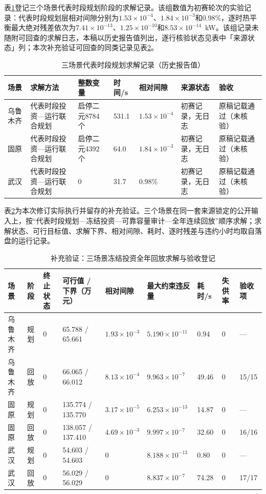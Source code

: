 表\ref{tab:alg-solver}登记三个场景代表时段规划阶段的求解记录。该组数值为初赛轮次的实验记录：代表时段规划层相对间隙分别为$1.53\times10^{-4}$、$1.84\times10^{-3}$和0.98\%，逐时热平衡最大绝对残差依次为$7.41\times10^{-13}$、$1.25\times10^{-10}$和$8.53\times10^{-14}$~kW。该组记录未随附可回查的求解日志，本稿以历史报告值列出，逐行核验状态见表中「来源状态」列；本次补充验证可回查的同类记录见表\ref{tab:alg-supplement}。

\begin{table}[H]
\centering
\caption{三场景代表时段规划求解记录（历史报告值）}
\label{tab:alg-solver}
\small
\begin{tabularx}{\textwidth}{@{}p{}p{}p{}p{}p{}p{}X@{}}
\toprule
场景 & 求解方法 & 整数变量 & 时间/s & 相对间隙 & 来源状态 & 验收\\
\midrule
乌鲁木齐 & 代表时段投资---运行联合规划 & 启停二元8784个 & 531.1 & $1.53\times10^{-4}$ & 初赛记录，无日志 & 原稿记载通过（未核验）\\
固原 & 代表时段投资---运行联合规划 & 启停二元4392个 & 64.0 & $1.84\times10^{-3}$ & 初赛记录，无日志 & 原稿记载通过（未核验）\\
武汉 & 代表时段投资---运行联合规划 & 0 & 31.7 & 0.98\% & 初赛记录，无日志 & 原稿记载通过（未核验）\\
\bottomrule
\end{tabularx}
\end{table}

表\ref{tab:alg-supplement}为本次修订实际执行并留存的补充验证。三个场景在同一套来源锁定的公开输入上，按“代表时段规划---冻结投资---可靠容量审计---全年连续回放”顺序求解；求解状态、可行目标值、求解下界、相对间隙、耗时、逐时残差与违约小时均取自落盘的运行记录。

\begin{table}[H]
\centering
\caption{补充验证：三场景冻结投资全年回放求解与验收登记}
\label{tab:alg-supplement}
\small
\begin{tabularx}{\textwidth}{@{}p{}p{}p{}p{}p{}p{}p{}p{}X@{}}
\toprule
场景 & 阶段 & 终止状态 & 可行值 / 下界（万元） & 相对间隙 & 最大约束违反量 & 耗时/s & 失供率 & 验收项\\
\midrule
乌鲁木齐 & 规划 & 0 & 65.788 / 65.661 & $1.93\times10^{-3}$ & $5.190\times10^{-11}$ & 0.94 & 0 & ---\\
乌鲁木齐 & 回放 & 0 & 66.065 / 66.012 & $8.13\times10^{-4}$ & $9.963\times10^{-7}$ & 49.46 & 0 & 15/15\\
固原 & 规划 & 0 & 135.774 / 135.770 & $3.17\times10^{-5}$ & $6.253\times10^{-13}$ & 14.87 & 0 & ---\\
固原 & 回放 & 0 & 138.057 / 137.410 & $4.69\times10^{-3}$ & $9.997\times10^{-7}$ & 32.60 & 0 & 16/16\\
武汉 & 规划 & 0 & 54.603 / 54.603 & 0 & $8.188\times10^{-13}$ & 0.80 & 0 & ---\\
武汉 & 回放 & 0 & 56.029 / 56.029 & 0 & $8.837\times10^{-7}$ & 74.28 & 0 & 17/17\\
\bottomrule
\end{tabularx}
\end{table}


